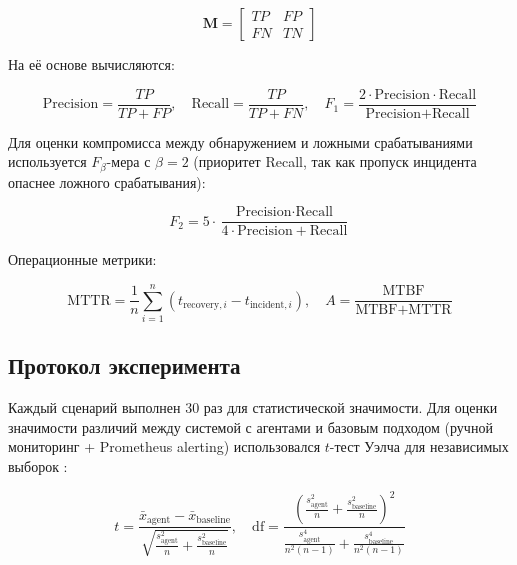 \begin{equation}
\mathbf{M} = \begin{bmatrix}
TP & FP \\
FN & TN
\end{bmatrix}
\label{eq:confusion_matrix}
\end{equation}

На её основе вычисляются:

\begin{equation}
\text{Precision} = \frac{TP}{TP + FP}, \quad
\text{Recall} = \frac{TP}{TP + FN}, \quad
F_1 = \frac{2 \cdot \text{Precision} \cdot \text{Recall}}{\text{Precision} + \text{Recall}}
\label{eq:precision_recall_f1}
\end{equation}

Для оценки компромисса между обнаружением и ложными срабатываниями используется $F_\beta$-мера с $\beta = 2$ (приоритет Recall, так как пропуск инцидента опаснее ложного срабатывания):

\begin{equation}
F_2 = 5 \cdot \frac{\text{Precision} \cdot \text{Recall}}{4 \cdot \text{Precision} + \text{Recall}}
\label{eq:f2_score}
\end{equation}

Операционные метрики:

\begin{equation}
\text{MTTR} = \frac{1}{n} \sum_{i=1}^{n} (t_{\text{recovery},i} - t_{\text{incident},i}), \quad
A = \frac{\text{MTBF}}{\text{MTBF} + \text{MTTR}}
\label{eq:mttr_availability}
\end{equation}

\subsection{Протокол эксперимента}

Каждый сценарий выполнен 30 раз для статистической значимости. Для оценки значимости различий между системой с агентами и базовым подходом (ручной мониторинг + Prometheus alerting) использовался $t$-тест Уэлча для независимых выборок \cite{hastie_elements,murphy_machine_learning}:

\begin{equation}
t = \frac{\bar{x}_{\text{agent}} - \bar{x}_{\text{baseline}}}{\sqrt{\frac{s_{\text{agent}}^2}{n} + \frac{s_{\text{baseline}}^2}{n}}}, \quad
\text{df} = \frac{\left(\frac{s_{\text{agent}}^2}{n} + \frac{s_{\text{baseline}}^2}{n}\right)^2}{\frac{s_{\text{agent}}^4}{n^2(n-1)} + \frac{s_{\text{baseline}}^4}{n^2(n-1)}}
\label{eq:welch_t_test}
\end{equation}

